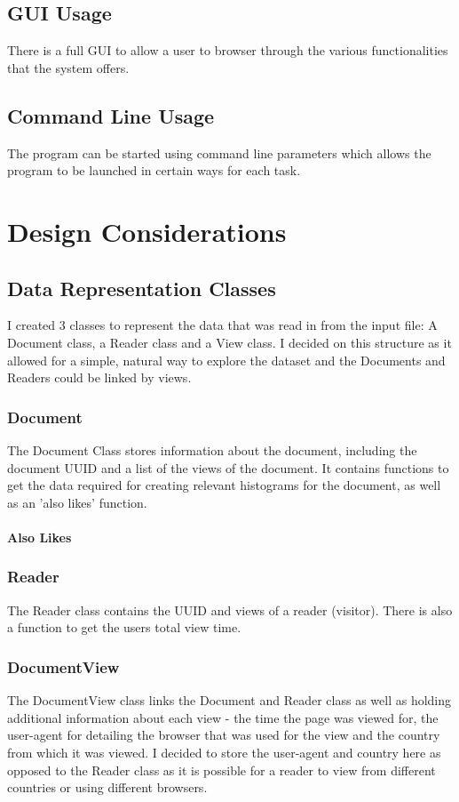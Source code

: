 \documentclass[12pt]{report}
\begin{document}
\section{GUI Usage}
There is a full GUI to allow a user to browser through the various functionalities that the system offers.
\section{Command Line Usage}
The program can be started using command line parameters which allows the program to be launched in certain ways for each task.

\chapter{Design Considerations}
\section{Data Representation Classes}
I created 3 classes to represent the data that was read in from the input file: A Document class, a Reader class and a View class.  I decided on this structure as it allowed for a simple, natural way to explore the dataset and the Documents and Readers could be linked by views.

\subsection{Document}
The Document Class stores information about the document, including the document UUID and a list of the views of the document.  It contains functions to get the data required for creating relevant histograms for the document, as well as an 'also likes' function.

\subsubsection{Also Likes}

\subsection{Reader}
The Reader class contains the UUID and views of a reader (visitor).  There is also a function to get the users total view time.

\subsection{DocumentView}
The DocumentView class links the Document and Reader class as well as holding additional information about each view - the time the page was viewed for, the user-agent for detailing the browser that was used for the view and the country from which it was viewed.  I decided to store the user-agent and country here as opposed to the Reader class as it is possible for a reader to view from different countries or using different browsers.
\end{document}
